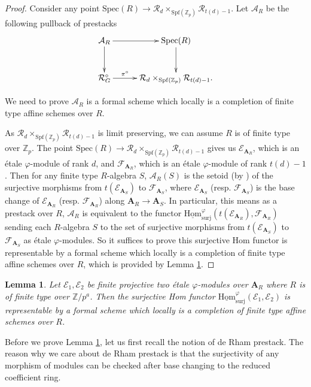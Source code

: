 \documentclass[10pt]{article}
\newtheorem{lem}[thm]{Lemma}
\numberwithin{equation}{section}
\newcommand{\bZ}{{\mathbb Z}}
\newcommand{\calA}{{\mathcal A}}
\newcommand{\calE}{{\mathcal E}}
\newcommand{\calF}{{\mathcal F}}
\newcommand{\calR}{{\mathcal R}}
\newcommand{\Hom}{{\mathrm{Hom}}}           %
\newcommand{\Spf}{{\mathrm{Spf}}}           %
\newcommand{\Spec}{{\mathrm{Spec}}}         %
\newcommand{\bfA}{{\textbf{A}}}
\newcommand{\surj}{\mathrm{surj}}
\begin{document}
\begin{proof}
Consider any point $\Spec(R)\to \calR_{d}\times_{\Spf(\bZ_p)}\calR_{t(d)-1}$. Let $\calA_R$ be the following pullback of prestacks
\begin{equation}
    \xymatrix@=1cm{
    \calA_R\ar[d]\ar[r] & \Spec(R)\ar[d]\\
    \calR^{\circ}_G\ar[r]^-{\pi^{\circ}} & \calR_{d}\times_{\Spf(\bZ_p)}\calR_{t(d)-1}.
    }
\end{equation}

We need to prove $\calA_R$ is a formal scheme which locally is a completion of finite type affine schemes over $R$.

 As $\calR_{d}\times_{\Spf(\bZ_p)}\calR_{t(d)-1}$ is limit preserving, we can assume $R$ is of finite type over $\bZ_p$. The point $\Spec(R)\to \calR_{d}\times_{\Spf(\bZ_p)}\calR_{t(d)-1}$ gives us $\calE_{\bfA_R}$, which is an \'etale $\varphi$-module of rank $d$, and $\calF_{\bfA_R}$, which is an \'etale $\varphi$-module of rank $t(d)-1$. Then for any finite type $R$-algebra $S$, $\calA_R(S)$ is the setoid (by \cite[\href{https://stacks.math.columbia.edu/tag/05UI}{Tag 05UI}]{stacks-project}) of the surjective morphisms from $t(\calE_{\bfA_S})$ to $\calF_{\bfA_S}$, where $\calE_{\bfA_S}$ (resp. $\calF_{\bfA_S}$) is the base change of $\calE_{\bfA_R}$ (resp. $\calF_{\bfA_R}$) along $\bfA_R\to \bfA_S$. In particular, this means as a prestack over $R$, $\calA_R$ is equivalent to the functor $\underline\Hom_{\surj}^{\varphi}(t(\calE_{\bfA_R}),\calF_{\bfA_R})$ sending each $R$-algebra $S$ to the set of surjective morphisms from $t(\calE_{\bfA_S})$ to $\calF_{\bfA_S}$ as \'etale $\varphi$-modules. So it suffices to prove this surjective Hom functor is representable by a formal scheme  which locally is a completion of finite type affine schemes over $R$, which is provided by Lemma \ref{representability-phi}.

 \end{proof}

\begin{lem}\label{representability-phi}
    Let $\calE_1,\calE_2$ be finite projective two \'etale $\varphi$-modules over $\bfA_R$ where $R$ is of finite type over $\bZ/p^a$. Then the surjective Hom functor $\underline\Hom_{\surj}^{\varphi}(\calE_1,\calE_2)$ is representable by a formal scheme  which locally is a completion of finite type affine schemes over $R$.
\end{lem}


Before we prove Lemma \ref{representability-phi}, let us first recall the notion of de Rham prestack. The reason why we care about de Rham prestack is that the surjectivity of any morphism of modules can be checked after base changing to the reduced coefficient ring.
\end{document}
